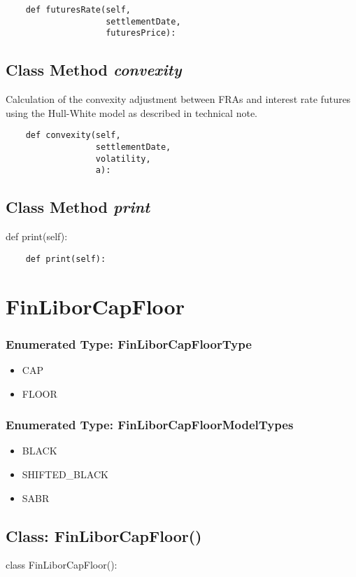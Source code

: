 \documentclass[twoside,11pt]{book}
\begin{document}
\begin{lstlisting}
    def futuresRate(self,
                    settlementDate,
                    futuresPrice):
\end{lstlisting}

\subsection{Class Method {\it convexity}}
Calculation of the convexity adjustment between FRAs and interest rate futures using the Hull-White model as described in technical note. 

\begin{lstlisting}
    def convexity(self, 
                  settlementDate,
                  volatility, 
                  a):
\end{lstlisting}

\subsection{Class Method {\it print}}
def print(self):

\begin{lstlisting}
    def print(self):
\end{lstlisting}

\newpage
\section{FinLiborCapFloor}

\subsubsection{Enumerated Type: FinLiborCapFloorType}
\begin{itemize}
\item{CAP}
\item{FLOOR}
\end{itemize}

\subsubsection{Enumerated Type: FinLiborCapFloorModelTypes}
\begin{itemize}
\item{BLACK}
\item{SHIFTED\_BLACK}
\item{SABR}
\end{itemize}

\subsection{Class: FinLiborCapFloor()}
class FinLiborCapFloor():
\end{document}
